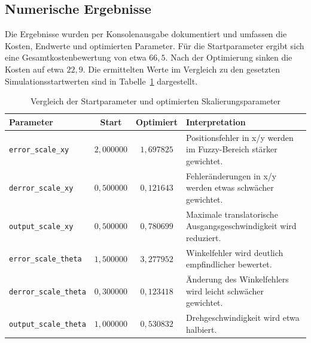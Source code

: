 \subsection{Numerische Ergebnisse}
Die Ergebnisse wurden per Konsolenausgabe dokumentiert und umfassen die Kosten, Endwerte und optimierten Parameter. Für die Startparameter ergibt sich eine Gesamtkostenbewertung von etwa $66{,}5$. Nach der Optimierung sinken die Kosten auf etwa $22{,}9$. 
Die ermittelten Werte im Vergleich zu den gesetzten Simulationsstartwerten sind in Tabelle~\ref{tab:optimierte_parameter} dargestellt.

\begin{table}[H]
    \centering
    \caption{Vergleich der Startparameter und optimierten Skalierungsparameter}
    \label{tab:optimierte_parameter}
    \small
    \begin{tabularx}{\textwidth}{l c c X}
        \toprule
        \textbf{Parameter} & \textbf{Start} & \textbf{Optimiert} & \textbf{Interpretation} \\
        \midrule

        \texttt{error\_scale\_xy} &
        $2{,}000000$ &
        $1{,}697825$ &
        Positionsfehler in x/y werden im Fuzzy-Bereich stärker gewichtet. \\

        \texttt{derror\_scale\_xy} &
        $0{,}500000$ &
        $0{,}121643$  &
        Fehleränderungen in x/y werden etwas schwächer gewichtet. \\

        \texttt{output\_scale\_xy} &
        $0{,}500000$ &
        $0{,}780699$ &
        Maximale translatorische Ausgangsgeschwindigkeit wird reduziert. \\

        \texttt{error\_scale\_theta} &
        $1{,}500000$ &
        $3{,}277952$ &
        Winkelfehler wird deutlich empfindlicher bewertet. \\

        \texttt{derror\_scale\_theta} &
        $0{,}300000$ &
        $0{,}123418$ &
        Änderung des Winkelfehlers wird leicht schwächer gewichtet. \\

        \texttt{output\_scale\_theta} &
        $1{,}000000$ &
        $0{,}530832$ &
        Drehgeschwindigkeit wird etwa halbiert. \\

        \bottomrule
    \end{tabularx}
\end{table}

